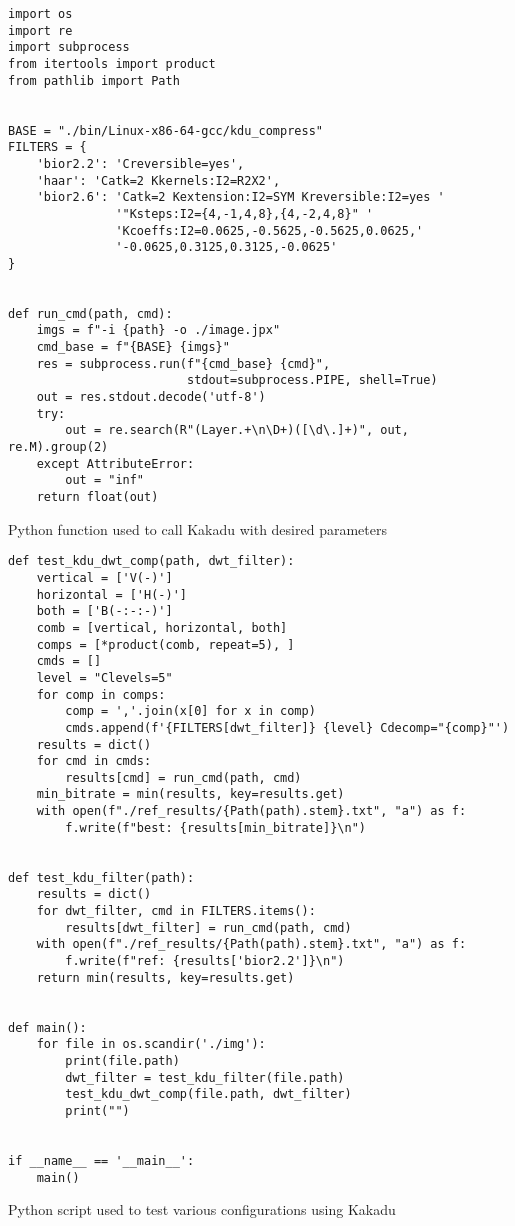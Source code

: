 \begin{listing}[!htb]
\begin{verbatim}
import os
import re
import subprocess
from itertools import product
from pathlib import Path


BASE = "./bin/Linux-x86-64-gcc/kdu_compress"
FILTERS = {
    'bior2.2': 'Creversible=yes',
    'haar': 'Catk=2 Kkernels:I2=R2X2',
    'bior2.6': 'Catk=2 Kextension:I2=SYM Kreversible:I2=yes '
               '"Ksteps:I2={4,-1,4,8},{4,-2,4,8}" '
               'Kcoeffs:I2=0.0625,-0.5625,-0.5625,0.0625,'
               '-0.0625,0.3125,0.3125,-0.0625'
}


def run_cmd(path, cmd):
    imgs = f"-i {path} -o ./image.jpx"
    cmd_base = f"{BASE} {imgs}"
    res = subprocess.run(f"{cmd_base} {cmd}",
                         stdout=subprocess.PIPE, shell=True)
    out = res.stdout.decode('utf-8')
    try:
        out = re.search(R"(Layer.+\n\D+)([\d\.]+)", out, re.M).group(2)
    except AttributeError:
        out = "inf"
    return float(out)
\end{verbatim}
\caption{Python function used to call Kakadu with desired parameters}
\label{lst:python_kdu_cmd}
\end{listing}

\begin{listing}[!htb]
\begin{verbatim}
def test_kdu_dwt_comp(path, dwt_filter):
    vertical = ['V(-)']
    horizontal = ['H(-)']
    both = ['B(-:-:-)']
    comb = [vertical, horizontal, both]
    comps = [*product(comb, repeat=5), ]
    cmds = []
    level = "Clevels=5"
    for comp in comps:
        comp = ','.join(x[0] for x in comp)
        cmds.append(f'{FILTERS[dwt_filter]} {level} Cdecomp="{comp}"')
    results = dict()
    for cmd in cmds:
        results[cmd] = run_cmd(path, cmd)
    min_bitrate = min(results, key=results.get)
    with open(f"./ref_results/{Path(path).stem}.txt", "a") as f:
        f.write(f"best: {results[min_bitrate]}\n")


def test_kdu_filter(path):
    results = dict()
    for dwt_filter, cmd in FILTERS.items():
        results[dwt_filter] = run_cmd(path, cmd)
    with open(f"./ref_results/{Path(path).stem}.txt", "a") as f:
        f.write(f"ref: {results['bior2.2']}\n")
    return min(results, key=results.get)


def main():
    for file in os.scandir('./img'):
        print(file.path)
        dwt_filter = test_kdu_filter(file.path)
        test_kdu_dwt_comp(file.path, dwt_filter)
        print("")


if __name__ == '__main__':
    main()
\end{verbatim}
\caption{Python script used to test various configurations using Kakadu}
\label{lst:python_kdu_script}
\end{listing}

